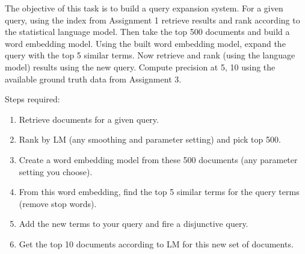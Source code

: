 \newcommand{\REM}[1]{}







\begin{hwproblem}

The objective of this task is to build a query expansion system. For a given query, using the index from Assignment 1 retrieve results and rank according to the statistical language model. Then take the top 500 documents and build a word embedding model. Using the built word embedding model, expand the query with the top 5 similar terms. Now retrieve and rank (using the language model) results using the new query. Compute precision at 5, 10 using the available ground truth data from Assignment 3. 

Steps required:
\begin{enumerate}
	\item Retrieve documents for a given query.
	\item Rank by LM (any smoothing and parameter setting) and pick top 500.
	\item Create a word embedding model from these 500 documents (any parameter setting you choose).
	\item From this word embedding, find the top 5 similar terms for the query terms (remove stop words).
	\item Add the new terms to your query and fire a disjunctive query.
	\item Get the top 10 documents according to LM for this new set of documents.
\end{enumerate}


 
\hwsolution{

}

\end{hwproblem}





